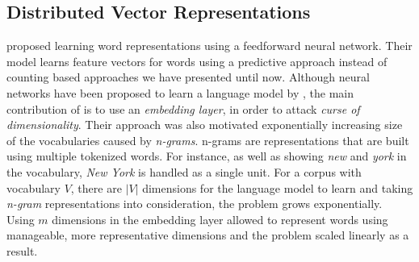 \subsection{Distributed Vector Representations}%
\label{sub:distributed_vector_representations}



\textcite{bengio_neural_2003} proposed learning word representations using a feedforward neural network.
Their model learns feature vectors for words using a predictive approach instead of counting based approaches we have presented until now.
Although neural networks have been proposed to learn a language model by \textcite{xu_can_2000}, the main contribution of \citeauthor{bengio_neural_2003} is to use an \emph{embedding layer}, in order to attack \emph{curse of dimensionality}.
Their approach was also motivated exponentially increasing size of the vocabularies caused by \emph{n-grams}.
n-grams are representations that are built using multiple tokenized words.
For instance, as well as showing \emph{new} and \emph{york} in the vocabulary, \emph{New York} is handled as a single unit.
For a corpus with vocabulary $V$, there are $|V|$ dimensions for the language model to learn and taking \emph{n-gram} representations into consideration, the problem grows exponentially.
Using $m$ dimensions in the embedding layer allowed \citeauthor{bengio_neural_2003} to represent words using manageable, more representative dimensions and the problem scaled linearly as a result.

